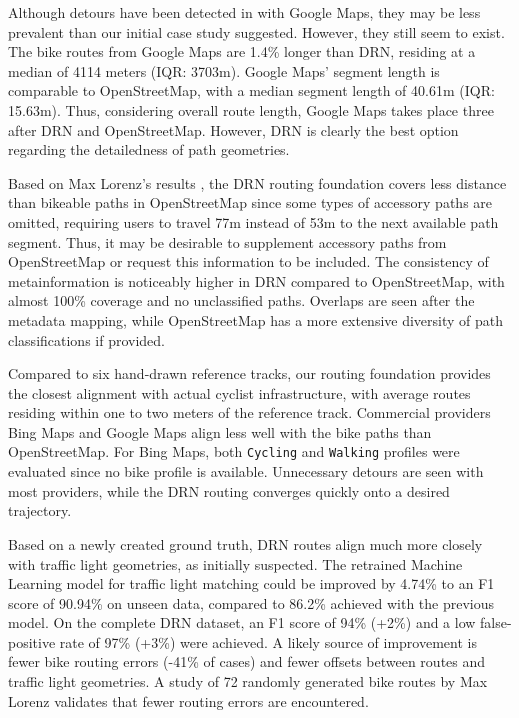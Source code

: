 Although detours have been detected in  with Google Maps, they may be less prevalent than our initial case study suggested. However, they still seem to exist. The bike routes from Google Maps are 1.4\% longer than DRN, residing at a median of 4114 meters (IQR: 3703m). Google Maps' segment length is comparable to OpenStreetMap, with a median segment length of 40.61m (IQR: 15.63m). Thus, considering overall route length, Google Maps takes place three after DRN and OpenStreetMap. However, DRN is clearly the best option regarding the detailedness of path geometries.

\begin{Summary}
Based on Max Lorenz's results \cite{lorenz_2022}, the DRN routing foundation covers less distance than bikeable paths in OpenStreetMap since some types of accessory paths are omitted, requiring users to travel 77m instead of 53m to the next available path segment. Thus, it may be desirable to supplement accessory paths from OpenStreetMap or request this information to be included. The consistency of metainformation is noticeably higher in DRN compared to OpenStreetMap, with almost 100\% coverage and no unclassified paths. Overlaps are seen after the metadata mapping, while OpenStreetMap has a more extensive diversity of path classifications if provided.

Compared to six hand-drawn reference tracks, our routing foundation provides the closest alignment with actual cyclist infrastructure, with average routes residing within one to two meters of the reference track. Commercial providers Bing Maps and Google Maps align less well with the bike paths than OpenStreetMap. For Bing Maps, both \texttt{Cycling} and \texttt{Walking} profiles were evaluated since no bike profile is available. Unnecessary detours are seen with most providers, while the DRN routing converges quickly onto a desired trajectory. 

Based on a newly created ground truth, DRN routes align much more closely with traffic light geometries, as initially suspected. The retrained Machine Learning model for traffic light matching could be improved by 4.74\% to an F1 score of 90.94\% on unseen data, compared to 86.2\% achieved with the previous model. On the complete DRN dataset, an F1 score of 94\% (+2\%) and a low false-positive rate of 97\% (+3\%) were achieved. A likely source of improvement is fewer bike routing errors (-41\% of cases) and fewer offsets between routes and traffic light geometries. A study of 72 randomly generated bike routes by Max Lorenz \cite{lorenz_2022} validates that fewer routing errors are encountered.


\end{Summary}
